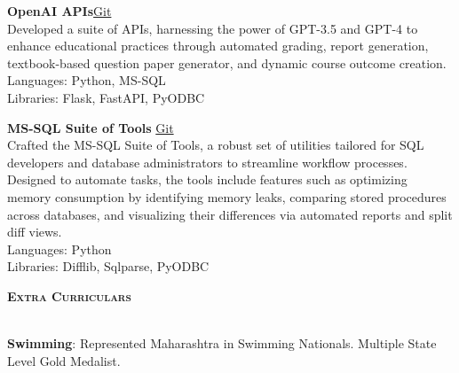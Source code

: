 \documentclass[a4paper]{article}
\newcommand{\lineunder} {
\vspace*{-8pt} \\
\hspace*{-18pt} \hrulefill \\
}
\newcommand{\header}[1]{%
{\hspace*{-18pt}\vspace*{6pt} \textsc{\textbf{\Large{#1}}}}%
\vspace*{-6pt} \lineunder
}
\begin{document}
{\textbf{OpenAI APIs}}\hfill \href{https://github.com/swarnimcodes/openai-gen-co-and-qp}{Git}\\
Developed a suite of APIs, harnessing the power of GPT-3.5 and GPT-4 to enhance educational practices 
through automated grading, report generation, textbook-based question paper generator, and 
dynamic course outcome creation. \\
Languages: Python, MS-SQL \\
Libraries: Flask, FastAPI, PyODBC \\
\vspace*{2mm}

{\textbf{MS-SQL Suite of Tools }}\hfill \href{https://github.com/swarnimcodes/Sequel}{Git}\\
Crafted the MS-SQL Suite of Tools, a robust set of utilities tailored for SQL developers 
and database administrators to streamline workflow processes. Designed to automate tasks, 
the tools include features such as optimizing memory consumption by identifying memory leaks, 
comparing stored procedures across databases, and visualizing their differences via automated reports and 
split diff views. \\
Languages: Python \\
Libraries: Difflib, Sqlparse, PyODBC \\

\vspace*{2mm}

\vspace{2mm}
\header{Extra Curriculars}
\vspace{1mm}

\textbf{Swimming}: Represented Maharashtra in Swimming Nationals. Multiple State Level Gold Medalist.
\end{document}
